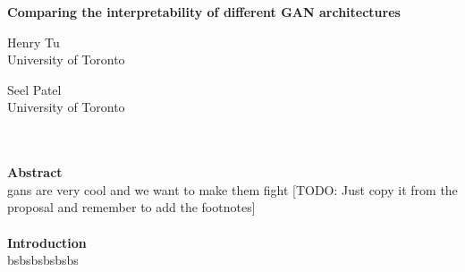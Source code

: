 \documentclass[12pt]{article}
\begin{document}
\begin{center}
    \textbf{Comparing the interpretability of different GAN architectures}
\end{center}
\begin{minipage}{.5\textwidth}
            \centering
            Henry Tu\\
            University of Toronto
\end{minipage}
\begin{minipage}{.5\textwidth}
            \centering
            Seel Patel\\
            University of Toronto
\end{minipage}
\\\\
\textbf{Abstract}\\
gans are very cool and we want to make them fight [TODO: Just copy it from the proposal and remember to add the footnotes]\\\\
\textbf{Introduction}\\
bsbsbsbsbsbs
\end{document}

